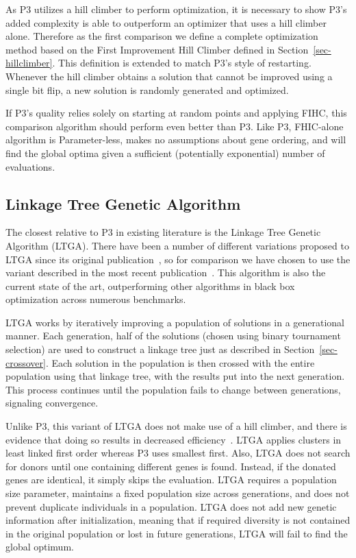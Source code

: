 \documentclass{sig-alternate}
\begin{document}
As P3 utilizes a hill climber to perform optimization, it is necessary
to show P3's added complexity is able to outperform an optimizer that
uses a hill climber alone.  Therefore as the first comparison we
define a complete optimization method based on the First Improvement
Hill Climber defined in Section~\ref{sec-hillclimber}.  This
definition is extended to match P3's style of restarting. Whenever the
hill climber obtains a solution that cannot be improved using a single
bit flip, a new solution is randomly generated and optimized.

If P3's quality relies solely on starting at random points and
applying FIHC, this comparison algorithm should perform even better
than P3.  Like P3, FHIC-alone algorithm is Parameter-less, makes no
assumptions about gene ordering, and will find the global optima given
a sufficient (potentially exponential) number of evaluations.

\subsection{Linkage Tree Genetic Algorithm}
\label{sec-ltga}
The closest relative to P3 in existing literature is the Linkage Tree Genetic Algorithm
(LTGA).  There have been a number of different variations proposed to LTGA since
its original publication~\cite{thierens:2010:ltga}, so for comparison we have chosen
to use the variant described in the most recent publication~\cite{thierens:2013:ltgahiff}.
This algorithm is also the current state of the art, outperforming other algorithms
in black box optimization across numerous benchmarks.

LTGA works by iteratively improving a population of solutions in a generational manner.
Each generation, half of the solutions (chosen using binary tournament selection)
are used to construct a linkage tree just as described in Section~\ref{sec-crossover}.
Each solution in the population is then crossed with the entire population using that
linkage tree, with the results put into the next generation.  This process continues
until the population fails to change between generations, signaling convergence.

Unlike P3, this variant of LTGA does not make use of a hill climber,
and there is evidence that doing so results in decreased
efficiency~\cite{bosman:2011:lsbbo}.  LTGA applies clusters in least
linked first order whereas P3 uses smallest first.  Also, LTGA does
not search for donors until one containing different genes is found.
Instead, if the donated genes are identical, it simply skips the
evaluation.  LTGA requires a population size parameter, maintains a
fixed population size across generations, and does not prevent
duplicate individuals in a population.  LTGA does not add new genetic
information after initialization, meaning that if required diversity
is not contained in the original population or lost in future
generations, LTGA will fail to find the global optimum.
\end{document}
